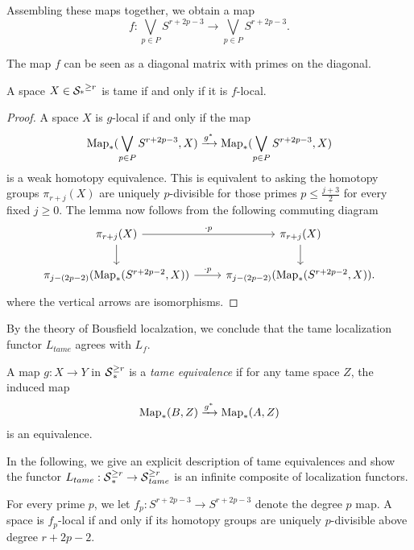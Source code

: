 Assembling these maps together, we obtain a map
\begin{equation}
\label{f}
	f: \bigvee_{p\in P}S^{r+2p-3} \to \bigvee_{p\in P}S^{r+2p-3}.
\end{equation}


\begin{remark}
	The map $f$ can be seen as a diagonal matrix with primes on the diagonal. 
\end{remark}

\begin{lemma}
	A space $X\in \operatorname{\mathcal{S}_{*}}^{\geq r}$ is tame if and only if it is $f$-local.
\end{lemma}
\begin{proof}
	A space $X$ is $g$-local if and only if the map
	\[
	\operatorname{Map}_{*}(\bigvee_{p\in P}S^{r+2p-3},X) \xrightarrow{g^*} \operatorname{Map}_{*}(\bigvee_{p\in P}S^{r+2p-3},X)
	\]
	is a weak homotopy equivalence. This is equivalent to asking the homotopy groups $\pi_{r+j}(X)$ are uniquely $p$-divisible for those primes $p\leq \frac{j+3}{2}$ for every fixed $j\geq 0$. 	The lemma now follows from the following commuting diagram
	\[	
	\begin{tikzcd}
		\pi_{r+j}(X) & \pi_{r+j}(X)\\
		\pi_{j-(2p-2)}(\map_*(S^{r+2p-2},X)) & \pi_{j-(2p-2)}(\map_*(S^{r+2p-2},X))
		\arrow[from=1-1, to=1-2,"\cdot p"]
		\arrow[from=2-1, to=2-2,"\cdot p"]
		\arrow[from=1-1, to=2-1]
		\arrow[from=1-2, to=2-2].
	\end{tikzcd}
	\]
	where the vertical arrows are isomorphisms.
\end{proof}


\begin{remark}
By the theory of Bousfield localzation, we conclude that the tame localization functor $L_{tame}$ agrees with $L_f$.	
\end{remark}

\begin{definition}
	\label{Tame equivalences}
	A map $g:X\to Y$ in $\operatorname{\mathcal{S}}^{\geq r}_{*}$ is a \emph{tame equivalence} if for any tame space $Z$, the induced map
	\[
	\operatorname{Map}_*(B,Z) \xrightarrow{g^*} \operatorname{Map}_*(A,Z)
	\]
	is an equivalence.
\end{definition}

In the following, we give an explicit description of tame equivalences and show the functor $L_{tame}:\operatorname{\mathcal{S}}^{\geq r}_* \to \operatorname{\mathcal{S}}^{\geq r}_{tame}$ is an infinite composite of localization functors.

For every prime $p$, we let $f_p:S^{r+2p-3}\to S^{r+2p-3}$ denote the degree $p$ map. A space is $f_p$-local if and only if its homotopy groups are uniquely $p$-divisible above degree $r+2p-2$.

